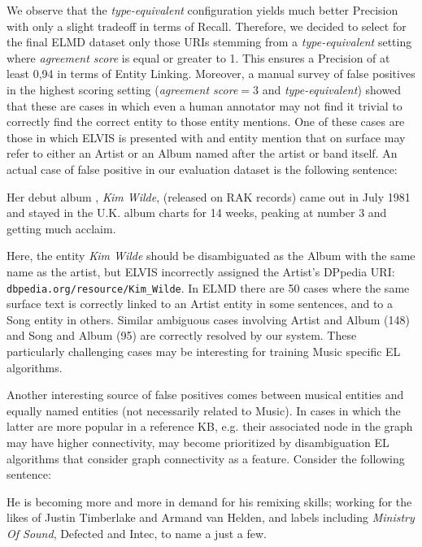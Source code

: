 We observe that the \textit{type-equivalent} configuration yields much better Precision with only a slight tradeoff in terms of Recall. Therefore, we decided to select for the final \textsc{ELMD} dataset only those URIs stemming from a \textit{type-equivalent} setting where \textit{agreement score} is equal or greater to 1. This ensures a Precision of at least 0,94 in terms of Entity Linking. Moreover, a manual survey of false positives in the highest scoring setting (\textit{agreement score}$=3$ and \textit{type-equivalent}) showed that these are cases in which even a human annotator may not find it trivial to correctly find the correct entity to those entity mentions. One of these cases are those in which \textsc{ELVIS} is presented with and entity mention that on surface may refer to either an Artist or an Album named after the artist or band itself. An actual case of false positive in our evaluation dataset is the following sentence:
\begin{adjustwidth}{2.5em}{20pt}
\begin{center}
Her debut album , \textit{Kim Wilde}, (released on RAK records) came out in July 1981 and stayed in the U.K. album charts for 14 weeks, peaking at number 3 and getting much acclaim.
\end{center}
\end{adjustwidth}

Here, the entity \textit{Kim Wilde} should be disambiguated as the Album with the same name as the artist, but \textsc{ELVIS} incorrectly assigned the Artist's DPpedia URI: {\footnotesize{\texttt{dbpedia.org/resource/Kim\_Wilde}}}. In \textsc{ELMD} there are 50 cases where the same surface text is correctly linked to an Artist entity in some sentences, and to a Song entity in others. Similar ambiguous cases involving Artist and Album (148) and Song and Album (95) are correctly resolved by our system. These particularly challenging cases may be interesting for training Music specific EL algorithms.

Another interesting source of false positives comes between musical entities and equally named entities (not necessarily related to Music). In cases in which the latter are more popular in a reference KB, e.g. their associated node in the graph may have higher connectivity, may become prioritized by disambiguation EL algorithms that consider graph connectivity as a feature. Consider the following sentence:

\begin{adjustwidth}{2.5em}{20pt}
\begin{center}
He is becoming more and more in demand for his remixing skills; working for the likes of Justin Timberlake and Armand van Helden, and labels including \textit{Ministry Of Sound}, Defected and Intec, to name a just a few.
\end{center}
\end{adjustwidth}

